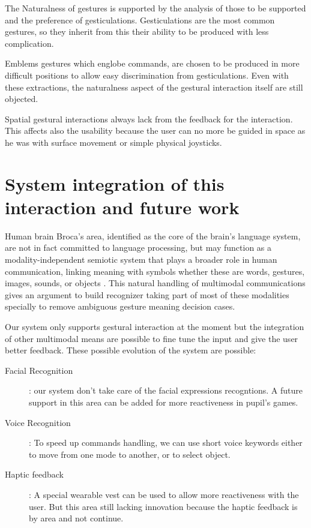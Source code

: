 \documentclass{llncs}
\begin{document}
The Naturalness of gestures is supported by the analysis of those to be
supported and the preference of gesticulations.
Gesticulations are the most common gestures, so they inherit from this their
ability to be produced with less complication.

Emblems gestures which englobe commands, are chosen to be produced in more
difficult positions to allow easy discrimination from gesticulations.
Even with these extractions, the naturalness aspect of the gestural interaction
itself are still objected. \cite{naturalNorman2010}

Spatial gestural interactions always lack from the feedback for the interaction.
This affects also the usability because the user can no more be guided in space
as he was with surface movement or simple physical joysticks.

\section{System integration of this interaction and future work}
Human brain Broca's area, identified as the core of the brain's language
system, are not in fact committed to language processing, but may function as a
modality-independent semiotic system that plays a broader role in human
communication, linking meaning with symbols whether these are words, gestures,
images, sounds, or objects \cite{SymbolicGest}.
This natural handling of multimodal communications gives an argument to build
recognizer taking part of most of these modalities specially to remove ambiguous
gesture meaning decision cases.

Our system only supports gestural interaction at the moment but the integration
of other multimodal means are possible to fine tune the input and give the user
better feedback.
These possible evolution of the system are possible:

\begin{description}
 \item[Facial Recognition]: our system don't take care of the facial expressions
recogntions. A future support in this area can be added for more reactiveness in
pupil's games.
 \item[Voice Recognition]: To speed up commands handling, we can use short voice
keywords either to move from one mode to another, or to select object.
 \item[Haptic feedback]: A special wearable vest can be used to allow more
reactiveness with the user. But this area still lacking innovation because the
haptic feedback is by area and not continue.
\end{description}
\end{document}
